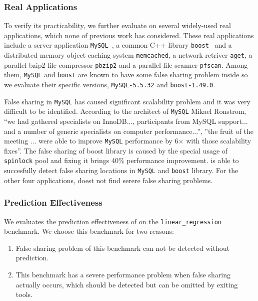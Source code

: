 \subsubsection{Real Applications}
To verify its practicability, we further evaluate \Predator{} 
on several widely-used real applications, which none of previous work has considered.  
These real applications include a server application \texttt{MySQL}~\cite{mysql}, 
a common C++ library \texttt{boost}~\cite{libfalsesharing} 
and a distributed memory object caching system \texttt{memcached}, a network retriver \texttt{aget}, 
a parallel bzip2 file compressor \texttt{pbzip2} and a parallel file scanner \texttt{pfscan}.
Among them, \texttt{MySQL} and \texttt{boost} are known to have some false sharing problem inside 
so we evaluate their specific versions, \texttt{MySQL-5.5.32} and
\texttt{boost-1.49.0}.

False sharing in \texttt{MySQL} has caused significant scalability problem and
it was very difficult to be identified. 
According to the architect of \texttt{MySQL} Mikael Ronstrom, ``we had gathered specialists on 
InnoDB..., participants from MySQL support... and a number of generic specialists on 
computer performance...'', ''the fruit of the meeting ... were able to 
improve \texttt{MySQL} performance by 6$\times$ with those scalability fixes''. 
The false sharing of boost library is caused by the special usage of \texttt{spinlock} pool and fixing
it brings 40\% performance improvement. 
\Predator{} is able to succesfully detect false sharing locations
in \texttt{MySQL} and \texttt{boost} library. 
For the other four applications, \Predator{} doest not find serere false sharing problems.

\subsubsection{Prediction Effectiveness}
\label{sec:predicteval}
We evaluates the prediction effectiveness of \Predator{} on the \texttt{linear\_regression} benchmark.
We choose this benchmark for two reasons:
\begin{enumerate}
\item
False sharing problem of this benchmark can not be detected without prediction. 

\item
This benchmark has a severe performance problem when false sharing actually occurs, which should be 
detected but can be omitted by exiting tools.
\end{enumerate}

